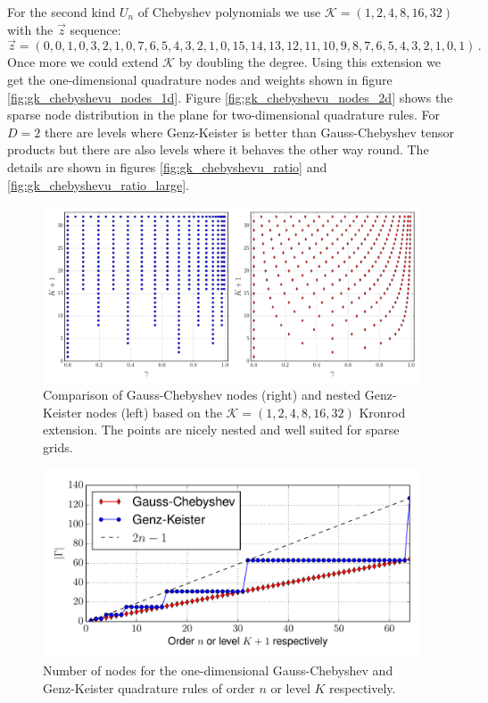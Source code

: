 \documentclass[a4paper,10pt]{article}
\begin{document}
For the second kind $U_n$ of Chebyshev polynomials we use
$\mathcal{K} = (1, 2, 4, 8, 16, 32)$ with the $\vec{z}$ sequence:
\begin{equation*}
  \vec{z} = (0, 0, 1, 0, 3, 2, 1, 0, 7, 6, 5, 4, 3, 2, 1, 0, 15, 14, 13, 12, 11,
             10, 9, 8, 7, 6, 5, 4, 3, 2, 1, 0, 1)\,.
\end{equation*}
Once more we could extend $\mathcal{K}$ by doubling the degree.
Using this extension we get the one-dimensional quadrature nodes and
weights shown in figure \ref{fig:gk_chebyshevu_nodes_1d}.
Figure \ref{fig:gk_chebyshevu_nodes_2d} shows the sparse
node distribution in the plane for two-dimensional quadrature rules.
For $D = 2$ there are levels where Genz-Keister is better than
Gauss-Chebyshev tensor products but there are also levels where
it behaves the other way round. The details are shown in figures
\ref{fig:gk_chebyshevu_ratio} and \ref{fig:gk_chebyshevu_ratio_large}.

\begin{figure}[h]
  \centering
  \includegraphics[width=\linewidth]{./img/gk_chebyshevu_nodes_cmp.pdf}
  \caption{Comparison of Gauss-Chebyshev nodes (right) and nested Genz-Keister nodes (left)
  based on the $\mathcal{K} = (1,2,4,8,16,32)$ Kronrod extension. The points are
  nicely nested and well suited for sparse grids.}
  \label{fig:gk_chebyshevu_nodes_cmp}
\end{figure}

\begin{figure}
  \centering
  \includegraphics[width=\linewidth]{./img/number_nodes_chebyshevu.pdf}
  \caption{Number of nodes for the one-dimensional Gauss-Chebyshev and Genz-Keister quadrature
  rules of order $n$ or level $K$ respectively.}
  \label{fig:number_nodes_chebyshevu}
\end{figure}
\end{document}

